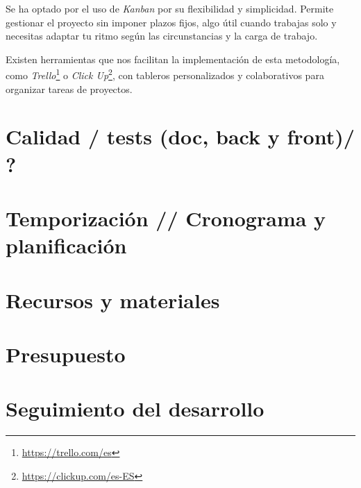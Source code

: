 Se ha optado por el uso de \textit{Kanban} por su flexibilidad y simplicidad. Permite gestionar el proyecto sin imponer plazos fijos, algo útil cuando trabajas solo y necesitas adaptar tu ritmo según las circunstancias y la carga de trabajo.

Existen herramientas que nos facilitan la implementación de esta metodología, como \textit{Trello}\footnote{\url{https://trello.com/es}} o \textit{Click Up}\footnote{\url{https://clickup.com/es-ES}}, con tableros personalizados y colaborativos para organizar tareas de proyectos.

\section{Calidad / tests (doc, back y front)/ ?}

\section{Temporización // Cronograma y planificación}

\section{Recursos y materiales}

\section{Presupuesto}

\section{Seguimiento del desarrollo}

